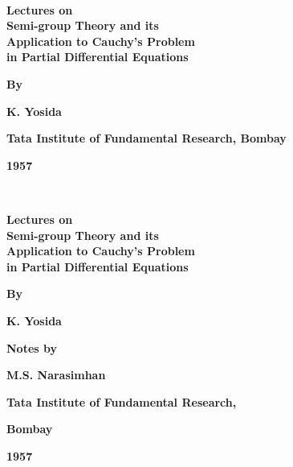 ~\thispagestyle{empty}
\begin{center}
{\Large\bf Lectures on}\\[5pt]
{\Large\bf Semi-group Theory and its}\\[5pt]
{\Large\bf Application to Cauchy's Problem}\\[5pt]
{\Large\bf in Partial Differential Equations} 
\vskip 1cm

{\bf By}
\medskip

{\large\bf K. Yosida}
\vfill

{\bf Tata Institute of Fundamental Research, Bombay}

{\bf 1957}
\end{center}
\eject

~\thispagestyle{empty}
\begin{center}
{\Large\bf Lectures on}\\[5pt]
{\Large\bf Semi-group Theory and its}\\[5pt]
{\Large\bf Application to Cauchy's Problem}\\[5pt]
{\Large\bf in Partial Differential Equations} 
\vskip 1cm


{\bf By}
\medskip

{\large\bf K. Yosida}
\vfill

{\bf Notes by}
\medskip

{\large\bf M.S. Narasimhan}

\vfill

{\bf Tata Institute of Fundamental Research,} 

{\bf Bombay}

{\bf 1957}
\end{center}


